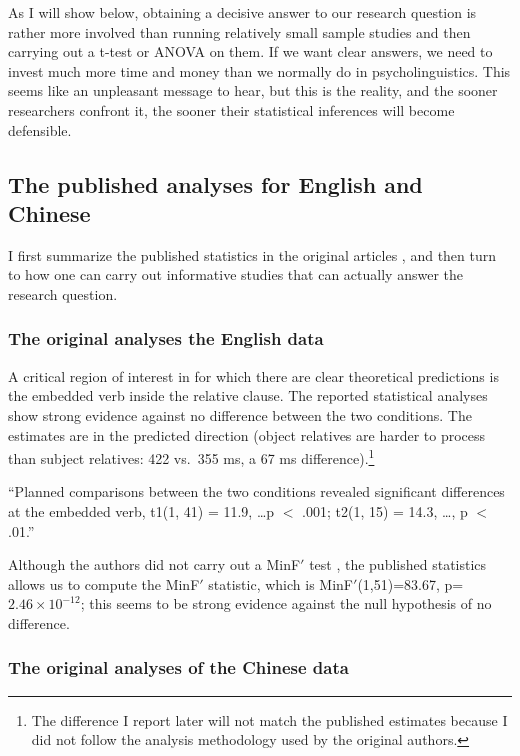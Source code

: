 \documentclass{ar-1col}\usepackage[]{graphicx}\usepackage[]{color}
\begin{document}
As I will show below, obtaining a decisive answer to our research question is rather more involved than running relatively small sample studies and then carrying out a t-test or ANOVA on them. If we want clear answers, we need to invest much more time and money than we normally do in psycholinguistics. This seems like an unpleasant message to hear, but this is the reality, and the sooner researchers confront it, the sooner their statistical inferences will become defensible.

\subsection{The published analyses for English and Chinese}

I first summarize the published statistics in the original articles \citep{grodner,gibsonwu}, and then turn to how one can carry out informative studies that can actually answer the research question.

\subsubsection{The original analyses the English data}

A critical region of interest in \citet{grodner} for which there are clear theoretical predictions is the embedded verb inside the relative clause. The reported statistical analyses show strong evidence against no difference between the two conditions. The estimates are  in the predicted direction (object relatives are harder to process than subject relatives: 422 vs.\ 355 ms, a 67 ms difference).\footnote{The difference I report later will not match the published estimates because I did not follow the analysis methodology used by the original authors.}

\begin{extract}
``Planned comparisons between the two conditions revealed significant differences at the embedded verb, t1(1, 41) = 11.9, \dots p $<$ .001; t2(1, 15) = 14.3, \dots, p $<$ .01.''
\end{extract}

Although the authors did not carry out a MinF$'$ test \citep{clark1973lfe}, the published statistics allows us to compute the MinF$'$ statistic, which is MinF$'$(1,51)=83.67, p=$2.46 \times 10^{-12}$; this seems to be strong evidence against the null hypothesis of no difference.



\subsubsection{The original analyses of the Chinese data}
\end{document}
